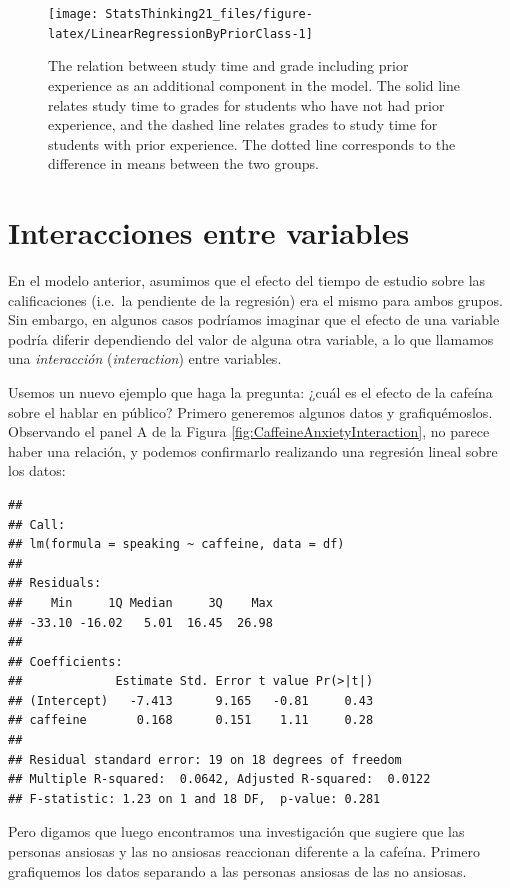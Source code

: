 \documentclass[
  12pt,
]{book}
\begin{document}
\begin{figure}
\texttt{[image: StatsThinking21\_files/figure-latex/LinearRegressionByPriorClass-1]} \caption{The relation between study time and grade including prior experience as an additional component in the model.  The solid line relates study time to grades for students who have not had prior experience, and the dashed line relates grades to study time for students with prior experience. The dotted line corresponds to the difference in means between the two groups.}\label{fig:LinearRegressionByPriorClass}
\end{figure}

\hypertarget{interacciones-entre-variables}{%
\section{Interacciones entre variables}\label{interacciones-entre-variables}}

En el modelo anterior, asumimos que el efecto del tiempo de estudio sobre las calificaciones (i.e.~la pendiente de la regresión) era el mismo para ambos grupos. Sin embargo, en algunos casos podríamos imaginar que el efecto de una variable podría diferir dependiendo del valor de alguna otra variable, a lo que llamamos una \emph{interacción} (\emph{interaction}) entre variables.

Usemos un nuevo ejemplo que haga la pregunta: ¿cuál es el efecto de la cafeína sobre el hablar en público? Primero generemos algunos datos y grafiquémoslos.
Observando el panel A de la Figura \ref{fig:CaffeineAnxietyInteraction}, no parece haber una relación, y podemos confirmarlo realizando una regresión lineal sobre los datos:

\begin{verbatim}
## 
## Call:
## lm(formula = speaking ~ caffeine, data = df)
## 
## Residuals:
##    Min     1Q Median     3Q    Max 
## -33.10 -16.02   5.01  16.45  26.98 
## 
## Coefficients:
##             Estimate Std. Error t value Pr(>|t|)
## (Intercept)   -7.413      9.165   -0.81     0.43
## caffeine       0.168      0.151    1.11     0.28
## 
## Residual standard error: 19 on 18 degrees of freedom
## Multiple R-squared:  0.0642,	Adjusted R-squared:  0.0122 
## F-statistic: 1.23 on 1 and 18 DF,  p-value: 0.281
\end{verbatim}

Pero digamos que luego encontramos una investigación que sugiere que las personas ansiosas y las no ansiosas reaccionan diferente a la cafeína. Primero grafiquemos los datos separando a las personas ansiosas de las no ansiosas.
\end{document}
